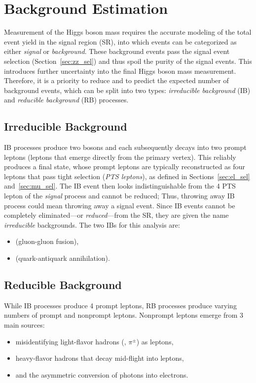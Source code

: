\section{Background Estimation}
\label{sec:bkg_estim}
Measurement of the Higgs boson mass requires the accurate modeling of the total event yield in the signal region (SR), into which events can be categorized as either \emph{signal} or \emph{background}.
These background events pass the signal event selection (Section~\ref{sec:zz_sel}) and thus spoil the purity of the signal events.
This introduces further uncertainty into the final Higgs boson mass measurement.
Therefore, it is a priority to reduce and to predict the expected number of background events, which can be split into two types: \emph{irreducible background} (IB) and \emph{reducible background} (RB) processes.

\subsection{Irreducible Background}
\label{sec:bkg_irred}
IB processes produce two \PZ bosons and each \PZ subsequently decays into two prompt leptons (leptons that emerge directly from the primary vertex).
This reliably produces a \fourl final state, whose prompt leptons are typically reconstructed as four leptons that pass tight selection (\emph{PTS leptons}), as defined in Sections~\ref{sec:el_sel} and~\ref{sec:mu_sel}.
The IB event then looks indistinguishable from the 4 PTS lepton of the \emph{signal} process and cannot be reduced;
Thus, throwing away IB process could mean throwing away a signal event.
Since IB events cannot be completely eliminated---or \emph{reduced}---from the SR, they are given the name \emph{irreducible} backgrounds.
The two IBs for this analysis are:
\begin{itemize}
    \item \ggzzfourl (gluon-gluon fusion),
    \item \qqzzfourl (quark-antiquark annihilation).
\end{itemize}

\subsection{Reducible Background}
\label{sec:redbkg}
While IB processes produce 4 prompt leptons, RB processes produce varying numbers of prompt and nonprompt leptons.
Nonprompt leptons emerge from 3 main sources:
\begin{itemize}
    \item misidentifying light-flavor hadrons (\eg, $\pi^{\pm}$) as leptons,
    \item heavy-flavor hadrons that decay mid-flight into leptons,
    \item and the asymmetric conversion of photons into electrons.
\end{itemize}

